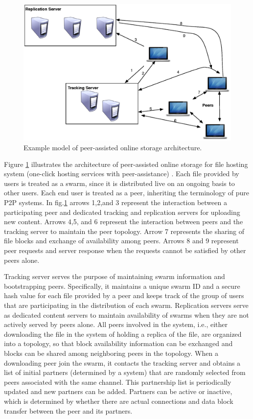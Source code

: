 \documentclass[conference]{IEEEtran}
\begin{document}
\begin{figure}[thb]
\begin{center}
\includegraphics[scale=0.4]{graphs/fs2you-arch.eps}
\end{center}
\caption{Example model of peer-assisted online storage architecture.}
\label{fig:fs2you}
\end{figure} 

Figure \ref{fig:fs2you} illustrates the architecture of peer-assisted online storage for file hosting system (one-click hosting services with peer-assistance) \cite{5061997}.
Each file provided by users is treated as a swarm, since it is distributed live on an ongoing basis to other users. 
Each end user is treated as a peer, inheriting the terminology of pure P2P systems.
In fig.\ref{fig:fs2you} arrows 1,2,and 3 represent the interaction between a participating peer and dedicated tracking and replication servers for uploading new content.
Arrows 4,5, and 6 represent the interaction between peers and the tracking server to maintain the peer topology. 
Arrow 7 represents the sharing of file blocks and exchange of availability among peers. 
Arrows 8 and 9 represent peer requests and server response when the requests cannot be satisfied by other peers alone. 

Tracking server serves the purpose of maintaining swarm information and bootstrapping peers.
Specifically, it maintains a unique swarm ID and a secure hash value for each file provided by a peer and keeps track of the group of users that are participating in the distribution of each swarm. 
Replication servers serve as dedicated content servers to maintain availability of swarms when they are not actively served by peers alone. 
All peers involved in the system, i.e., either downloading the file in the system of holding a replica of the file, are organized into a topology, so that block availability information can be exchanged and blocks can be shared among neighboring peers in the topology.
When a downloading peer join the swarm, it contacts the tracking server and obtains a list of initial partners (determined by a system) that are randomly selected from peers associated with the same channel.  
This partnership list is periodically updated and new partners can be added. 
Partners can be active or inactive, which is determined by whether there are actual connections and data block transfer between the peer and its partners.
\end{document}
